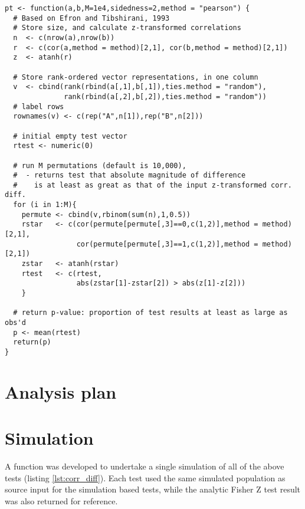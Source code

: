 \begin{lstlisting}[float=h,caption={Permutation test},label={lst:pt}]
pt <- function(a,b,M=1e4,sidedness=2,method = "pearson") {
  # Based on Efron and Tibshirani, 1993
  # Store size, and calculate z-transformed correlations
  n  <- c(nrow(a),nrow(b))
  r  <- c(cor(a,method = method)[2,1], cor(b,method = method)[2,1])
  z  <- atanh(r)
  
  # Store rank-ordered vector representations, in one column
  v  <- cbind(rank(rbind(a[,1],b[,1]),ties.method = "random"),
              rank(rbind(a[,2],b[,2]),ties.method = "random"))
  # label rows
  rownames(v) <- c(rep("A",n[1]),rep("B",n[2]))
  
  # initial empty test vector
  rtest <- numeric(0)
  
  # run M permutations (default is 10,000),
  #  - returns test that absolute magnitude of difference
  #    is at least as great as that of the input z-transformed corr. diff.
  for (i in 1:M){
    permute <- cbind(v,rbinom(sum(n),1,0.5))
    rstar   <- c(cor(permute[permute[,3]==0,c(1,2)],method = method)[2,1],
                 cor(permute[permute[,3]==1,c(1,2)],method = method)[2,1])
    zstar   <- atanh(rstar)
    rtest   <- c(rtest,
                 abs(zstar[1]-zstar[2]) > abs(z[1]-z[2]))
    } 
  
  # return p-value: proportion of test results at least as large as obs'd
  p <- mean(rtest)
  return(p)
}
\end{lstlisting}

\section{Analysis plan}


\section{Simulation}
A function was developed to undertake a single simulation of all of the above tests (listing \ref{lst:corr_diff}).  Each test used the same simulated population as source input for the simulation based tests, while the analytic Fisher Z test result was also returned for reference.

